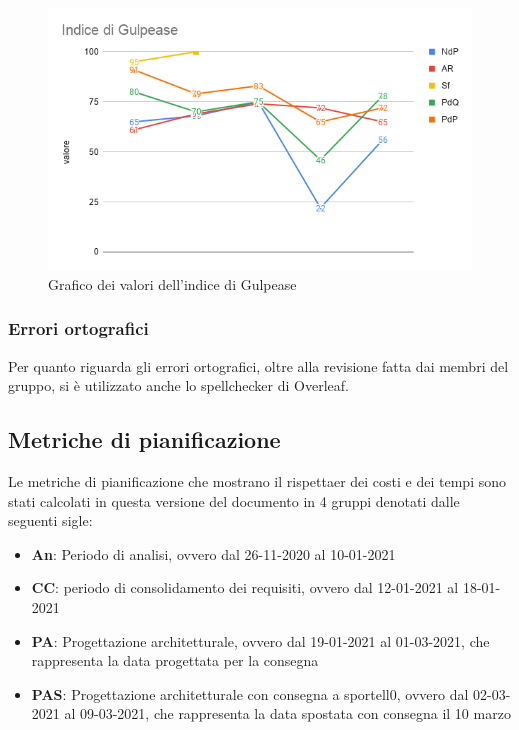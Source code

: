 \begin{figure}[H]
    \centering
    \includegraphics[width=15 cm]{source/sections/images/funzioni_di_gulpease.png}
    \caption{Grafico dei valori dell'indice di Gulpease}
\end{figure}


\subsubsection{Errori ortografici}

Per quanto riguarda gli errori ortografici, oltre alla revisione fatta dai membri del gruppo, si è utilizzato anche lo spellchecker di Overleaf.
\newpage

\subsection{Metriche di pianificazione}
Le metriche di pianificazione che mostrano il rispettaer dei costi e dei tempi sono stati calcolati in questa versione del documento in 4 gruppi denotati dalle seguenti sigle:
\begin{itemize}
    \item \textbf{An}: Periodo di analisi, ovvero dal 26-11-2020 al 10-01-2021
    \item \textbf{CC}: periodo di consolidamento dei requisiti, ovvero dal 12-01-2021 al 18-01-2021
    \item \textbf{PA}: Progettazione architetturale, ovvero dal 19-01-2021 al 01-03-2021, che rappresenta la data progettata per la consegna
    \item \textbf{PAS}: Progettazione architetturale con consegna a sportell0, ovvero dal 02-03-2021 al 09-03-2021, che rappresenta la data spostata con consegna il 10 marzo
\end{itemize}

